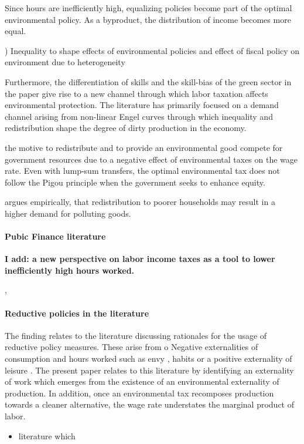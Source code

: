Since hours are inefficiently high, equalizing policies become part of the optimal environmental policy. As a byproduct, the distribution of income becomes more equal.


) Inequality to shape effects of environmental policies and effect of fiscal policy on environment due to heterogeneity

 Furthermore, the differentiation of skills and the skill-bias of the green sector in the paper give rise to a new channel through which labor taxation affects environmental protection. The literature has primarily focused on a demand channel arising from non-linear Engel curves through which inequality and redistribution shape the degree of dirty production in the economy.   

\cite{Jacobs2019RedistributionCurves} the motive to redistribute and to provide an environmental good compete for government resources due to a negative effect of environmental taxes on the wage rate. Even with lump-sum transfers, the optimal environmental tax does not follow the Pigou principle when the government seeks to enhance equity.

\cite{Sager2019IncomeCurves} argues empirically, that redistribution to poorer households may result in a higher demand for polluting goods. 
\paragraph{Pubic Finance literature}
\textbf{I add: a new perspective on labor income taxes as a tool to lower inefficiently high hours worked. }

 \cite{Heathcote2017OptimalFramework}, \cite{Loebbing2019NationalChange}

\paragraph{Reductive policies in the literature}
The finding relates to the literature discussing rationales for the usage of reductive policy measures. These arise from o
Negative externalities of consumption and hours worked such as
 envy \cite{Alvarez-Cuadrado2007EnvyHours}, habits \cite{Ravn2006DeepHabits}  or a positive externality of leisure \cite{Alesina2005WorkDifferent}. The present paper relates to this literature by identifying an externality of work which emerges from the existence of an environmental externality of production. In addition, once an environmental tax recomposes production towards a cleaner alternative, the wage rate understates the marginal product of labor. 
\begin{itemize}
	\item literature which \cite{Alvarez-Cuadrado2007EnvyHours}
\end{itemize}


